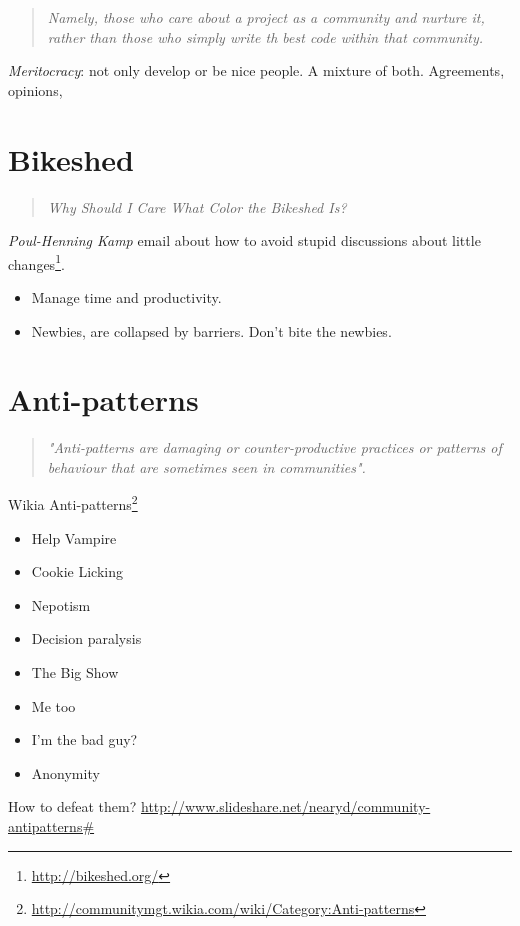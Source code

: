 \documentclass[11pt]{scrartcl}
\begin{document}
\begin{quote}
    \emph{Namely, those who care about a project as a community and nurture it, rather than those who simply write th best code within that community.}
\end{quote}

\emph{Meritocracy}: not only develop or be nice people. A mixture of both. Agreements, opinions, 

\section{Bikeshed}
\label{sec:bikeshed}

\begin{quote}
    \emph{Why Should I Care What Color the Bikeshed Is?}
\end{quote}

\emph{Poul-Henning Kamp} email about how to avoid stupid discussions about little changes\footnote{\url{http://bikeshed.org/}}.

\begin{itemize}
	\item Manage time and productivity.
	\item Newbies, are collapsed by barriers. Don't bite the newbies.
\end{itemize}


\section{Anti-patterns}
\label{sec:anti-patterns}

\begin{quote}
    \emph{"Anti-patterns are damaging or counter-productive practices or patterns of behaviour that are sometimes seen in communities".}
\end{quote}

\par Wikia Anti-patterns\footnote{\url{http://communitymgt.wikia.com/wiki/Category:Anti-patterns}}

\begin{itemize}
	\item Help Vampire
	\item Cookie Licking
	\item Nepotism
	\item Decision paralysis
	\item The Big Show
	\item Me too
	\item I'm the bad guy?
	\item Anonymity
\end{itemize}

\par How to defeat them? \url{http://www.slideshare.net/nearyd/community-antipatterns#}

\end{document}
